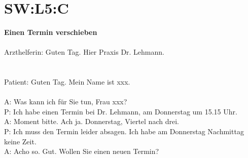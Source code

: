 \section{SW:L5:C}
\begin{center}
    \begin{minipage}[t]{0.9\textwidth}
    \end{minipage}
\end{center}
\textbf{Einen Termin verschieben}  \\
\\
\noindent
Arzthelferin: Guten Tag. Hier Praxis Dr. Lehmann. \\
\\
\\
\noindent
Patient:  Guten Tag. Mein Name ist xxx. \\
\\
\noindent
A: Was kann ich für Sie tun, Frau xxx? \\
P: Ich habe einen Termin bei Dr. Lehmann, am Donnerstag um 15.15 Uhr.  \\
A: Moment bitte. Ach ja. Donnerstag, Viertel nach drei. \\
P: Ich muss den Termin leider absagen. Ich habe am Donnerstag Nachmittag keine Zeit. \\
A: Acho so. Gut. Wollen Sie einen neuen Termin?  \\
